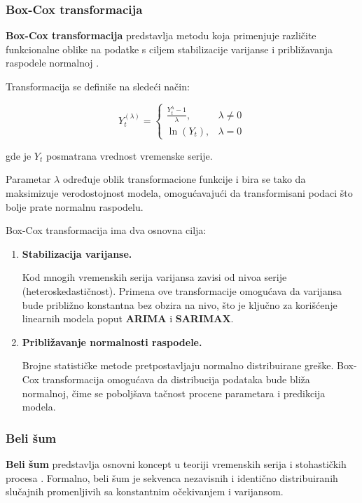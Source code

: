 \documentclass[12pt]{article}
\begin{document}
\subsubsection{Box-Cox transformacija}

\textbf{Box-Cox transformacija} predstavlja metodu koja primenjuje različite funkcionalne oblike na podatke s ciljem stabilizacije varijanse i približavanja raspodele normalnoj \cite{boxcox1964}.

\bigskip

Transformacija se definiše na sledeći način:

$$
Y_t^{(\lambda)} =
\begin{cases}
\frac{Y_t^{\lambda} - 1}{\lambda}, & \lambda \neq 0 \\[6pt]
\ln(Y_t), & \lambda = 0
\end{cases}
$$

gde je $Y_t$ posmatrana vrednost vremenske serije.

\bigskip

Parametar $\lambda$ određuje oblik transformacione funkcije i bira se tako da maksimizuje verodostojnost modela, omogućavajući da transformisani podaci što bolje prate normalnu raspodelu.

\bigskip

Box-Cox transformacija ima dva osnovna cilja:

\begin{enumerate}
\item \textbf{Stabilizacija varijanse.}

Kod mnogih vremenskih serija varijansa zavisi od nivoa serije (heteroskedastičnost). Primena ove transformacije omogućava da varijansa bude približno konstantna bez obzira na nivo, što je ključno za korišćenje linearnih modela poput \textbf{ARIMA} i \textbf{SARIMAX}.

\item \textbf{Približavanje normalnosti raspodele.}

Brojne statističke metode pretpostavljaju normalno distribuirane greške. Box-Cox transformacija omogućava da distribucija podataka bude bliža normalnoj, čime se poboljšava tačnost procene parametara i predikcija modela.
\end{enumerate}

\subsubsection{Beli šum}

\textbf{Beli šum} predstavlja osnovni koncept u teoriji vremenskih serija i stohastičkih procesa \cite{box1970, brockwell2002}. Formalno, beli šum je sekvenca nezavisnih i identično distribuiranih slučajnih promenljivih sa konstantnim očekivanjem i varijansom.
\end{document}
